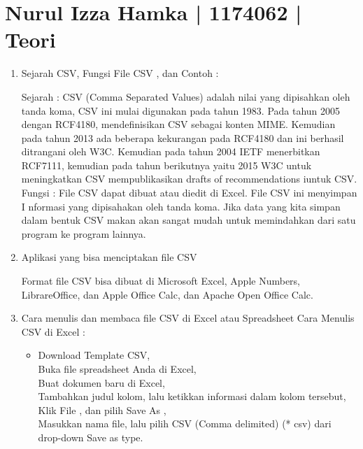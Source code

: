 \section{Nurul Izza Hamka | 1174062 | Teori}
\begin{enumerate}

\item Sejarah CSV, Fungsi File CSV , dan Contoh :

Sejarah : CSV (Comma Separated Values) adalah nilai yang dipisahkan oleh tanda koma, CSV ini mulai digunakan pada tahun 1983. 
Pada tahun 2005  dengan RCF4180, mendefinisikan CSV sebagai konten MIME. 
Kemudian pada tahun 2013 ada beberapa kekurangan pada RCF4180	dan ini berhasil ditrangani oleh W3C. 
Kemudian pada tahun 2004 IETF menerbitkan RCF7111, 
kemudian pada tahun berikutnya yaitu 2015 W3C untuk meningkatkan CSV mempublikasikan  drafts of recommendations iuntuk CSV.\\

Fungsi : File CSV dapat dibuat atau diedit di Excel. 
File CSV ini menyimpan I nformasi yang dipisahakan  oleh tanda koma. 
Jika data yang kita simpan dalam bentuk CSV makan akan sangat mudah untuk memindahkan dari satu program ke program lainnya.



\item Aplikasi yang bisa menciptakan file CSV 

Format file CSV bisa dibuat di Microsoft Excel, Apple Numbers, LibrareOffice, dan Apple Office Calc, dan Apache Open Office Calc.

\item Cara menulis dan membaca file CSV di Excel atau Spreadsheet
Cara Menulis CSV di Excel :\\
\begin{itemize}
\item Download Template CSV,\\
Buka file spreadsheet Anda di Excel,\\
Buat dokumen baru di Excel,\\
Tambahkan judul kolom, lalu ketikkan informasi dalam kolom tersebut,\\
Klik File , dan pilih Save As ,\\
Masukkan nama file, lalu pilih CSV (Comma delimited) (* csv) dari drop-down Save as type.\\
\end{itemize}


\end{enumerate}
